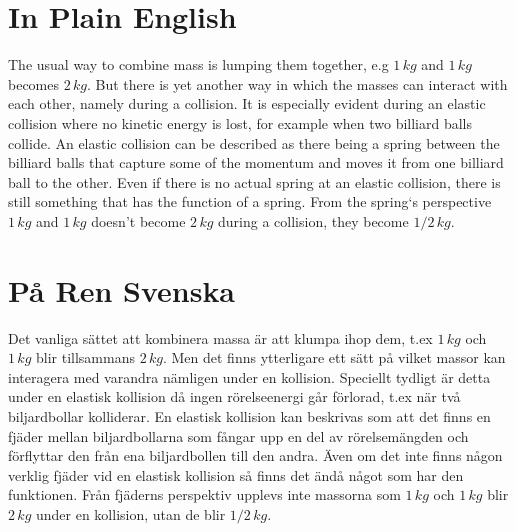\documentclass[]{elementary-physics}
\begin{document}
\appendix

\section{In Plain English}

The usual way to combine mass is lumping them together, e.g $1 \, kg$ and $1 \, kg$ becomes $2 \, kg$.
But there is yet another way in which the masses can interact with each other, namely during a collision.
It is especially evident during an elastic collision where no kinetic energy is lost, for example when two billiard balls collide.
An elastic collision can be described as there being a spring between the billiard balls that capture some of the momentum and moves it from one billiard ball to the other.
Even if there is no actual spring at an elastic collision, there is still something that has the function of a spring.
From the spring`s perspective $1 \, kg$ and $1 \, kg$ doesn’t become $2 \, kg$ during a collision, they become $1/2 \, kg$.

\section{På Ren Svenska}

Det vanliga sättet att kombinera massa är att klumpa ihop dem, t.ex $1 \, kg$ och $1 \, kg$ blir tillsammans $2 \, kg$.
Men det finns ytterligare ett sätt på vilket massor kan interagera med varandra nämligen under en kollision.
Speciellt tydligt är detta under en elastisk kollision då ingen rörelseenergi går förlorad, t.ex när två biljardbollar kolliderar.
En elastisk kollision kan beskrivas som att det finns en fjäder mellan biljardbollarna som fångar upp en del av rörelsemängden och förflyttar den från ena biljardbollen till den andra.
Även om det inte finns någon verklig fjäder vid en elastisk kollision så finns det ändå något som har den funktionen.
Från fjäderns perspektiv upplevs inte massorna som $1 \, kg$ och $1 \, kg$ blir $2 \, kg$ under en kollision, utan de blir $1/2 \, kg$.



\printbibliography
\end{document}
